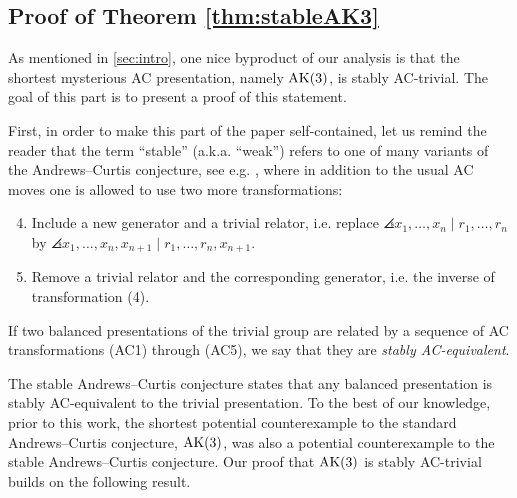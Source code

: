 
\subsection{Proof of Theorem \ref{thm:stableAK3}}
\label{sec:stable_ak3}


As mentioned in \autoref{sec:intro}, one nice byproduct of our analysis is that the shortest mysterious AC presentation, namely $\text{AK}(3)$, is stably AC-trivial. The goal of this part is to present a proof of this statement.

First, in order to make this part of the paper self-contained, let us remind the reader that the term ``stable'' (a.k.a. ``weak'') refers to one of many variants of the Andrews--Curtis conjecture, see e.g. \cite{MMS,Meier2016,Bagherifard2021}, where in addition to the usual AC moves one is allowed to use two more transformations:
\begin{enumerate}[label=(AC\arabic*)]
	\setcounter{enumi}{3}
	\item Include a new generator and a trivial relator, i.e. replace $\angles{x_1, \dots, x_n \mid r_1, \dots, r_n}$ by $\angles{x_1, \dots, x_n, x_{n+1} \mid r_1, \dots, r_n, x_{n+1}}$.
	\item Remove a trivial relator and the corresponding generator, i.e. the inverse of transformation (4).
\end{enumerate}

\begin{definition}
If two balanced presentations of the trivial group are related by a sequence of AC transformations (AC1) through (AC5), we say that they are \textit{stably AC-equivalent}.
\end{definition}
The stable Andrews--Curtis conjecture states that any balanced presentation is stably AC-equivalent to the trivial presentation.
To the best of our knowledge, prior to this work, the shortest potential counterexample to the standard Andrews--Curtis conjecture, $\text{AK}(3)$, was also a potential counterexample to the stable Andrews--Curtis conjecture. Our proof that $\text{AK}(3)$ is stably AC-trivial builds on the following result.

